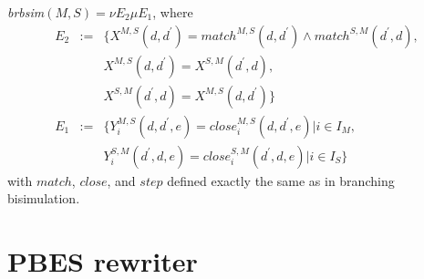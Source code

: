 \documentclass{article}
\begin{document}
\emph{brbsim}$(M,S)=\nu E_{2}\mu E_{1}$, where%
\begin{equation*}
\begin{array}{ccl}
E_{2} & := & \{X^{M,S}(d,d^{\prime })=match^{M,S}(d,d^{\prime })\wedge
match^{S,M}(d^{\prime },d), \\
&  & X^{M,S}(d,d^{\prime })=X^{S,M}(d^{\prime },d), \\
&  & X^{S,M}(d^{\prime },d)=X^{M,S}(d,d^{\prime })\} \\
E_{1} & := & \{Y_{i}^{M,S}(d,d^{\prime },e)=close_{i}^{M,S}(d,d^{\prime
},e)|i\in I_{M}, \\
&  & Y_{i}^{S,M}(d^{\prime },d,e)=close_{i}^{S,M}(d^{\prime },d,e)|i\in
I_{S}\}%
\end{array}%
\end{equation*}%
with $match$, $close$, and $step$ defined exactly the same as in branching
bisimulation.

\section{PBES rewriter}
\end{document}
